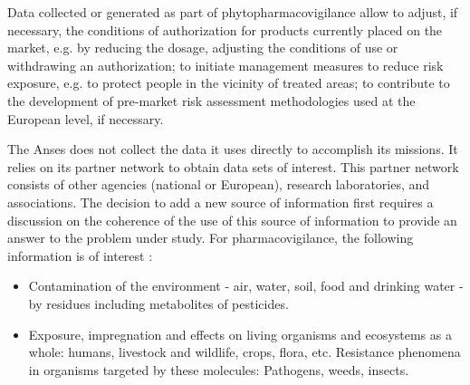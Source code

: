 Data collected or generated as part of phytopharmacovigilance allow to adjust, if necessary, the conditions of authorization for products currently placed on the market, e.g. by reducing the dosage, adjusting the conditions of use or withdrawing an authorization; to initiate management measures to reduce risk exposure, e.g. to protect people in the vicinity of treated areas; to contribute to the development of pre-market risk assessment methodologies used at the European level, if necessary.  

The Anses does not collect the data it uses directly to accomplish its missions. It relies on its partner network to obtain data sets of interest. This partner network consists of other agencies (national or European), research laboratories, and associations. The decision to add a new source of information first requires a discussion on the coherence of the use of this source of information to provide an answer to the problem under study. For pharmacovigilance, the following information is of interest : 
\begin{itemize}
\item Contamination of the environment - air, water, soil, food and drinking water - by residues including metabolites of pesticides.
\item Exposure, impregnation and effects on living organisms and ecosystems as a whole: humans, livestock and wildlife, crops, flora, etc. Resistance phenomena in organisms targeted by these molecules: Pathogens, weeds, insects.
\end{itemize}

